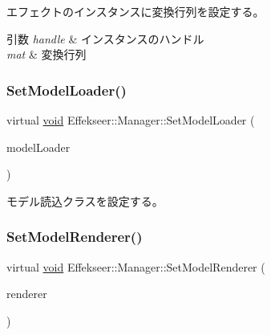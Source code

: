 エフェクトのインスタンスに変換行列を設定する。 


\begin{DoxyParams}{引数}
{\em handle} & インスタンスのハンドル \\
\hline
{\em mat} & 変換行列 \\
\hline
\end{DoxyParams}
\mbox{\label{class_effekseer_1_1_manager_a994104b9b353a09861d27ec87b09fa1c}} 
\subsubsection{\texorpdfstring{Set\+Model\+Loader()}{SetModelLoader()}}
{\footnotesize\ttfamily virtual \mbox{\hyperlink{namespace_effekseer_ab34c4088e512200cf4c2716f168deb56}{void}} Effekseer\+::\+Manager\+::\+Set\+Model\+Loader (\begin{DoxyParamCaption}\item[{\mbox{\hyperlink{class_effekseer_1_1_model_loader}{Model\+Loader}} $\ast$}]{model\+Loader }\end{DoxyParamCaption})\hspace{0.3cm}{\ttfamily [pure virtual]}}



モデル読込クラスを設定する。 

\mbox{\label{class_effekseer_1_1_manager_aa423ee424d0b713ac4939fc7faf39b9c}} 
\subsubsection{\texorpdfstring{Set\+Model\+Renderer()}{SetModelRenderer()}}
{\footnotesize\ttfamily virtual \mbox{\hyperlink{namespace_effekseer_ab34c4088e512200cf4c2716f168deb56}{void}} Effekseer\+::\+Manager\+::\+Set\+Model\+Renderer (\begin{DoxyParamCaption}\item[{\mbox{\hyperlink{class_effekseer_1_1_model_renderer}{Model\+Renderer}} $\ast$}]{renderer }\end{DoxyParamCaption})\hspace{0.3cm}{\ttfamily [pure virtual]}}




